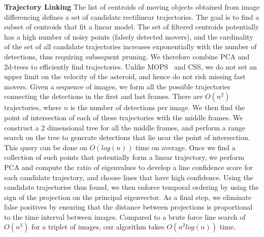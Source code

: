 \documentclass{article}
\begin{document}
{\bf Trajectory Linking}
The list of centroids of moving objects obtained from image differencing defines a set of candidate rectilinear trajectories.  The goal is to find a subset of centroids that fit a linear model. The set of filtered centroids potentially has a high number of noisy points (falsely detected movers), and the cardinality of the set of all candidate trajectories increases exponentially with the number of detections, thus requiring subsequent pruning. We therefore combine PCA and 2d-trees to efficiently find trajectories. Unlike MOPS~\cite{denneau2013pan} and CSS\cite{css2014}, we do not set an upper limit on the velocity of the asteroid, and hence do not risk missing fast movers. Given a sequence of images, we form all the possible trajectories connecting the detections in the first and last frames. There are $O(n^2)$ trajectories, where $n$ is the number of detections per image. We then find the point of intersection of each of these trajectories with the middle frames. We construct a 2 dimensional tree for all the middle frames, and perform a range search on the tree to generate detections that lie near the point of intersection. This query can be done on $O(log(n))$ time on average. Once we find a collection of such points that potentially form a linear trajectory, we perform PCA and compute the ratio of eigenvalues to develop a line confidence score for each candidate trajectory, and choose lines that have high confidence. Using the candidate trajectories thus found, we then enforce temporal ordering by using the sign of the projection on the principal eigenvector.  As a final step, we eliminate false positives by ensuring that the distance between projections is proportional to the time interval between images. Compared to a brute force line search of $O(n^3)$ for a triplet of images, our algorithm takes $O(n^2log(n))$ time.


\end{document}

